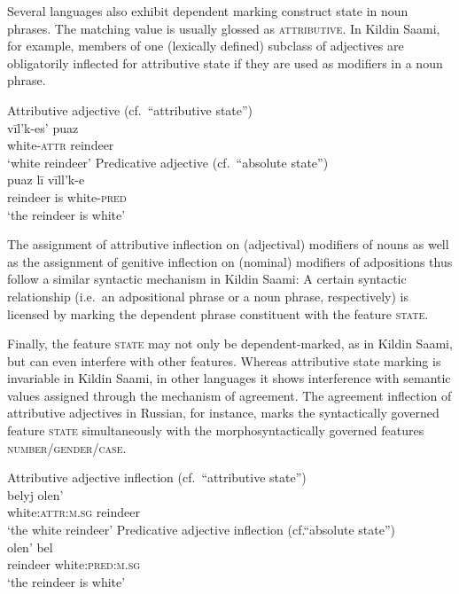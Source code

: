 Several languages also exhibit dependent marking construct state in noun phrases. The matching value is usually glossed as \textsc{attributive}. In Kildin Saami, for example, members of one (lexically defined) subclass of adjectives are obligatorily inflected for attributive state if they are used as modifiers in a noun phrase.
\begin{exe}
\ex\label{state np kildin}
\begin{xlist}
\ex	
\textrm{Attributive adjective (cf.~“attributive state”)}\\
\gll 	vīl'k-es'		puaz\\
	white-\textsc{attr}	reindeer\\
\glt 	‘white reindeer’
\ex	
\textrm{Predicative adjective (cf.~“absolute state”)}\\
\gll	puaz lī vīll'k-e\\
	reindeer is white-\textsc{pred}\\
\glt	‘the reindeer is white’
\end{xlist}
\end{exe}
The assignment of attributive inflection on (adjectival) modifiers of nouns as well as the assignment of genitive inflection on (nominal) modifiers of adpositions thus follow a similar syntactic mechanism in Kildin Saami: A certain syntactic relationship (i.e.~an adpositional phrase or a noun phrase, respectively) is licensed by marking the dependent phrase constituent with the feature \textsc{state}.

Finally, the feature \textsc{state} may not only be dependent-marked, as in Kildin Saami, but can even interfere with other features. Whereas attributive state marking is invariable in Kildin Saami, in other languages it shows interference with semantic values assigned through the mechanism of agreement. The agreement inflection of attributive adjectives in Russian, for instance, marks the syntactically governed feature \textsc{state} simultaneously with the morphosyntactically governed features \textsc{number/gender/case}.
\begin{exe}
\ex\label{state np russian}
\begin{xlist}
\ex 
\textrm{Attributive adjective inflection (cf.~“attributive state”)}\\
\gll 	belyj	olen'\\
	white:\textsc{attr:m.sg}	reindeer\\
\glt 	‘the white reindeer’
\ex	
\textrm{Predicative adjective inflection (cf.“absolute state”)}\\
\gll	olen' bel\\
	reindeer white:\textsc{pred:m.sg}\\
\glt	‘the reindeer is white’
\end{xlist}
\end{exe}

